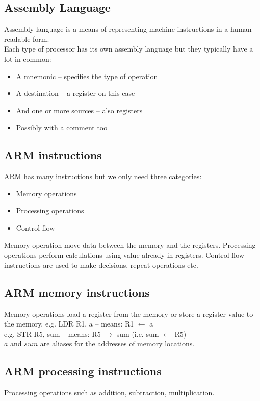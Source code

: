 \documentclass{article}
\begin{document}
\subsection{Assembly Language}
Assembly language is a means of representing machine instructions in a human readable form.\\
Each type of processor has its own assembly language but they typically have a lot in common:
\begin{itemize}
	\item A mnemonic – specifies the type of operation
	\item A destination – a register on this case
	\item And one or more sources – also registers
	\item Possibly with a comment too
\end{itemize}

\subsection{ARM instructions}
ARM has many instructions but we only need three categories:
\begin{itemize}
	\item Memory operations
	\item Processing operations
	\item Control flow
\end{itemize}
Memory operation move data between the memory and the registers. Processing operations perform calculations using value already in registers. Control flow instructions are used to make decisions, repeat operations etc.

\subsection{ARM memory instructions}
Memory operations load a register from the memory or store a register value to the memory.
e.g. LDR R1, a – means: R1 \(\leftarrow\) a\\
e.g. STR R5, sum – means: R5 \(\rightarrow\) sum (i.e. sum \(\leftarrow\) R5)\\

$a$ and $sum$ are aliases for the addresses of memory locations.

\subsection{ARM processing instructions}
Processing operations such as addition, subtraction, multiplication.
\end{document}
